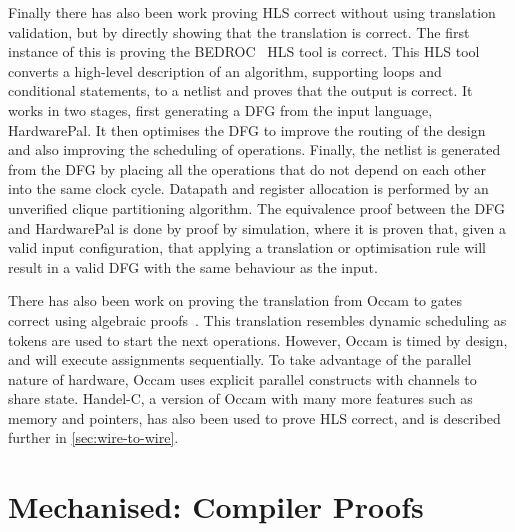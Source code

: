 Finally there has also been work proving HLS correct without using translation validation, but by
directly showing that the translation is correct.  The first instance of this is proving the
BEDROC~\cite{chapman92_verif_bedroc} HLS tool is correct.  This HLS tool converts a high-level
description of an algorithm, supporting loops and conditional statements, to a netlist and proves
that the output is correct.  It works in two stages, first generating a DFG from the input language,
HardwarePal.  It then optimises the DFG to improve the routing of the design and also improving the
scheduling of operations.  Finally, the netlist is generated from the DFG by placing all the
operations that do not depend on each other into the same clock cycle.  Datapath and register
allocation is performed by an unverified clique partitioning algorithm.  The equivalence proof
between the DFG and HardwarePal is done by proof by simulation, where it is proven that, given a
valid input configuration, that applying a translation or optimisation rule will result in a valid
DFG with the same behaviour as the input.

There has also been work on proving the translation from Occam to gates~\cite{page91_compil_occam}
correct using algebraic proofs~\cite{jifeng93_towar}.  This translation resembles dynamic scheduling
as tokens are used to start the next operations.  However, Occam is timed by design, and will
execute assignments sequentially.  To take advantage of the parallel nature of hardware, Occam uses
explicit parallel constructs with channels to share state.  Handel-C, a version of Occam with many
more features such as memory and pointers, has also been used to prove HLS correct, and is described
further in \cref{sec:wire-to-wire}.

\section{Mechanised: Compiler Proofs}

